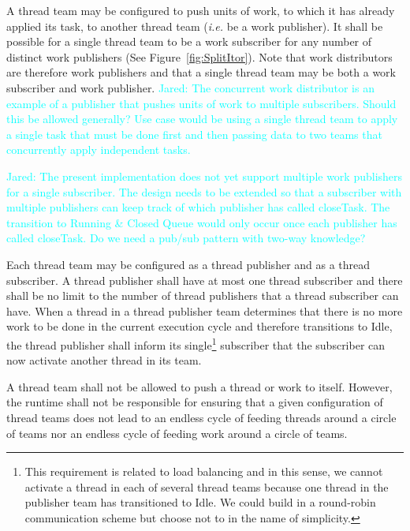 \documentclass{article}
\newcommand{\Jared}[1]          {\textcolor{cyan}{Jared: #1}}
\begin{document}
\begin{req}
A thread team may be configured to push units of work, to which it has already
applied its task, to another thread team (\textit{i.e.} be a work publisher).
It shall be possible for a single thread
team to be a work subscriber for any number of distinct work
publishers (See Figure~\ref{fig:SplitItor}).  Note that work
distributors are therefore work publishers and that a single thread team may be
both a work subscriber and work publisher.  \Jared{The concurrent work
distributor is an example of a publisher that pushes units of work to multiple
subscribers.  Should this be allowed generally?  Use case would be using a
single thread team to apply a single task that must be done first and then
passing data to two teams that concurrently apply independent tasks.}
\end{req}

\Jared{The present implementation does not yet support multiple work
publishers for a single subscriber.  The design needs to be extended so that
a subscriber with multiple publishers can keep track of which publisher has
called closeTask.  The transition to Running \& Closed Queue would only occur
once each publisher has called closeTask.  Do we need a pub/sub pattern with
two-way knowledge?}

\begin{req}
\label{req:ThreadSubPub}
Each thread team may be configured as a thread publisher and as a
thread subscriber.  A thread publisher shall have at most one thread
subscriber and there shall be no limit to the number of thread publishers that a
thread subscriber can have.  When a thread in a thread publisher team determines
that there is no more work to be done in the current execution cycle and
therefore transitions to Idle, the thread publisher shall inform its
single\footnote{This requirement is related to load balancing and in this sense,
we cannot activate a thread in each of several thread teams because one thread
in the publisher team has transitioned to Idle.  We could build in a round-robin communication
scheme but choose not to in the name of simplicity.} subscriber that the
subscriber can now activate another thread in its team.
\end{req}

\begin{req}
A thread team shall not be allowed to push a thread or work to itself.  However,
the runtime shall not be responsible for ensuring that a given configuration of
thread teams does not lead to an endless cycle of feeding threads around a
circle of teams nor an endless cycle of feeding work around a circle of teams.
\end{req}
\end{document}

